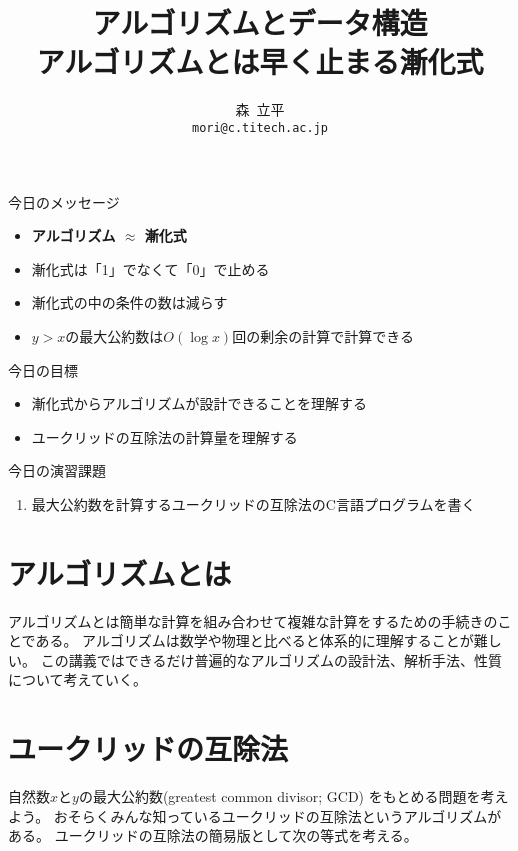 \documentclass[a4paper,oneside,onecolumn,openany,article,10pt]{memoir}
\title{アルゴリズムとデータ構造\\\vspace{.5em} \Large アルゴリズムとは早く止まる漸化式}
\date{}
\author{森~立平\\ \texttt{mori@c.titech.ac.jp}}
\theoremstyle{remark}
\begin{document}
\maketitle


\noindent
今日のメッセージ
\begin{itemize}
\item \textbf{アルゴリズム $\approx$ 漸化式}
\item 漸化式は「1」でなくて「0」で止める
\item 漸化式の中の条件の数は減らす
\item $y>x$の最大公約数は$O(\log x)$回の剰余の計算で計算できる
\end{itemize}

\noindent
今日の目標
\begin{itemize}
\item 漸化式からアルゴリズムが設計できることを理解する
\item ユークリッドの互除法の計算量を理解する
\end{itemize}

\noindent
今日の演習課題
\begin{enumerate}
\item 最大公約数を計算するユークリッドの互除法のC言語プログラムを書く
\end{enumerate}


\section{アルゴリズムとは}
アルゴリズムとは簡単な計算を組み合わせて複雑な計算をするための手続きのことである。
アルゴリズムは数学や物理と比べると体系的に理解することが難しい。
この講義ではできるだけ普遍的なアルゴリズムの設計法、解析手法、性質について考えていく。

\section{ユークリッドの互除法}
自然数$x$と$y$の最大公約数(greatest common divisor; GCD) をもとめる問題を考えよう。
おそらくみんな知っているユークリッドの互除法というアルゴリズムがある。
ユークリッドの互除法の簡易版として次の等式を考える。
\end{document}
